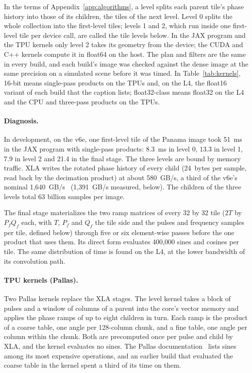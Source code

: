 \documentclass[11pt]{article}
\begin{document}
In the terms of Appendix~\ref{app:algorithms}, a level splits each parent tile's phase history into those of its children, the tiles of the next level. Level 0 splits the whole collection into the first-level tiles; levels 1 and 2, which run inside one first-level tile per device call, are called the tile levels below. In the JAX program and the TPU kernels only level 2 takes its geometry from the device; the CUDA and C++ kernels compute it in float64 on the host. The plan and filters are the same in every build, and each build's image was checked against the dense image at the same precision on a simulated scene before it was timed. In Table~\ref{tab:kernels}, 16-bit means single-pass products on the TPUs and, on the L4, the float16 variant of each build that the caption lists; float32-class means float32 on the L4 and the CPU and three-pass products on the TPUs.

\paragraph{Diagnosis.} In development, on the v6e, one first-level tile of the Panama image took 51~ms in the JAX program with single-pass products: 8.3~ms in level 0, 13.3 in level 1, 7.9 in level 2 and 21.4 in the final stage. The three levels are bound by memory traffic. XLA writes the rotated phase history of every child (24~bytes per sample, read back by the decimation product) at about 580~GB/s, a third of the v6e's nominal 1,640~GB/s~\cite{google2024trillium} (1,391~GB/s measured, below). The children of the three levels total 63 billion samples per image.

The final stage materializes the two ramp matrices of every 32 by 32 tile ($2T$ by $P_f Q_f$ each, with $T$, $P_f$ and $Q_f$ the tile side and the pulses and frequency samples per tile, defined below) through five or six element-wise passes before the one product that uses them. Its direct form evaluates 400,000 sines and cosines per tile. The same distribution of time is found on the L4, at the lower bandwidth of its convolution path.

\paragraph{TPU kernels (Pallas).} Two Pallas kernels replace the XLA stages. The level kernel takes a block of pulses and a window of columns of a parent into the core's vector memory and applies the phase ramps of up to eight children in turn. Each ramp is the product of a coarse table, one angle per 128-column chunk, and a fine table, one angle per column within the chunk. Both are precomputed once per pulse and child by XLA, and the kernel evaluates no sines. The Pallas documentation~\cite{pallasdocs} lists sines among its most expensive operations, and an earlier build that evaluated the coarse table in the kernel spent a third of its time on them.
\end{document}
